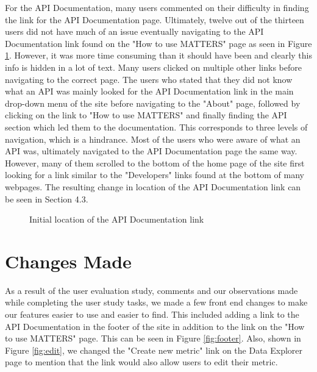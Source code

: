 		For the API Documentation, many users commented on their difficulty in finding 
		the link for the API Documentation page. Ultimately, twelve out of the thirteen 
		users did not have much of an issue eventually navigating to the API Documentation 
		link found on the "How to use MATTERS" page as seen in Figure \ref{fig:how}. However, it was more 
		time consuming than it should have been and clearly this info is hidden in a lot of text. Many users clicked on multiple other 
		links before navigating to the correct page. The users who stated that they did not 
		know what an API was mainly looked for the API Documentation link in the main drop-down 
		menu of the site before navigating to the "About" page, followed by clicking on the 
		link to "How to use MATTERS" and finally finding the API section which led them to 
		the documentation. This corresponds to three levels of navigation, which is a hindrance. Most of the users who were aware of what an API was, ultimately 
		navigated to the API Documentation page the same way. However, many of them scrolled 
		to the bottom of the home page of the site first looking for a link similar to the "Developers" 
		links found at the bottom of many webpages. The resulting change in location of the API Documentation link can be seen in Section 4.3.
		
			\begin{figure}[t]
				\centering
				\caption{Initial location of the API Documentation link}
				\label{fig:how}
			\end{figure}
		
	\section{Changes Made}

		As a result of the user evaluation study, comments and our observations made while completing 
		the user study tasks, we made a few front end changes to make our features easier 
		to use and easier to find. This included adding a link to the API Documentation in 
		the footer of the site in addition to the link on the "How to use MATTERS" page. This can be seen 
		in Figure \ref{fig:footer}.  Also, shown in Figure \ref{fig:edit}, we changed the "Create new metric" link on the 
		Data Explorer page to mention that the link would also allow users to edit their metric. 
		
